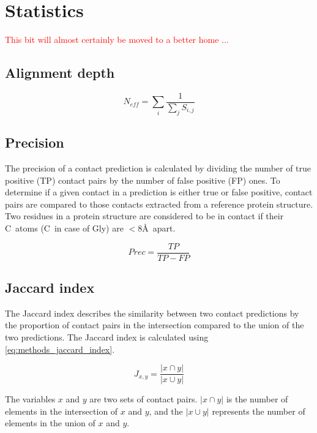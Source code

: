 \section{Statistics}
\textcolor{red}{This bit will almost certainly be moved to a better home ...}
\subsection{Alignment depth} \label{sec:methods_alignment_depth}
\begin{equation} 
N_{eff}=\sum_{i}\frac{1}{\sum_{j}S_{i,j}}
\label{eq:methods_alignment_depth}
\end{equation}


\subsection{Precision} \label{sec:methods_precision}
The precision of a contact prediction is calculated by dividing the number of true positive (TP) contact pairs by the number of false positive (FP) ones. To determine if a given contact in a prediction is either true or false positive, contact pairs are compared to those contacts extracted from a reference protein structure. Two residues in a protein structure are considered to be in contact if their C\textbeta\ atoms (C\textalpha\ in case of Gly) are $<8$\AA\ apart.

\begin{equation} 
Prec = \frac{TP}{TP-FP}
\label{eq:methods_precision}
\end{equation}

\subsection{Jaccard index} \label{sec:methods_jaccard_idx}
The Jaccard index describes the similarity between two contact predictions by the proportion of contact pairs in the intersection compared to the union of the two predictions. The Jaccard index is calculated using \cref{eq:methods_jaccard_index}.

\begin{equation} 
J_{x,y}=\frac{\left |x \cap y\right |}{\left |x \cup y\right |}
\label{eq:methods_jaccard_index}
\end{equation}

The variables $x$ and $y$ are two sets of contact pairs. $\left |x \cap y\right |$ is the number of elements in the intersection of $x$ and $y$, and the $\left |x \cup y\right |$ represents the number of elements in the union of $x$ and $y$.

